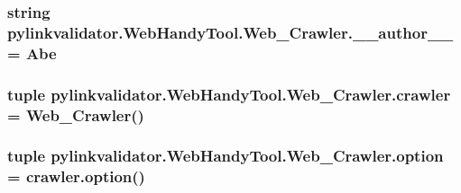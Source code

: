 \subsubsection[{\+\_\+\+\_\+author\+\_\+\+\_\+}]{\setlength{\rightskip}{0pt plus 5cm}string pylinkvalidator.\+Web\+Handy\+Tool.\+Web\+\_\+\+Crawler.\+\_\+\+\_\+author\+\_\+\+\_\+ = \textquotesingle{}Abe\textquotesingle{}}\hypertarget{namespacepylinkvalidator_1_1_web_handy_tool_1_1_web___crawler_affb3151f3f1a14a483da5ff3c2c148cf}{}\label{namespacepylinkvalidator_1_1_web_handy_tool_1_1_web___crawler_affb3151f3f1a14a483da5ff3c2c148cf}
\subsubsection[{crawler}]{\setlength{\rightskip}{0pt plus 5cm}tuple pylinkvalidator.\+Web\+Handy\+Tool.\+Web\+\_\+\+Crawler.\+crawler = {\bf Web\+\_\+\+Crawler}()}\hypertarget{namespacepylinkvalidator_1_1_web_handy_tool_1_1_web___crawler_a3b4c79fe9756714e1b12573b644499bc}{}\label{namespacepylinkvalidator_1_1_web_handy_tool_1_1_web___crawler_a3b4c79fe9756714e1b12573b644499bc}
\subsubsection[{option}]{\setlength{\rightskip}{0pt plus 5cm}tuple pylinkvalidator.\+Web\+Handy\+Tool.\+Web\+\_\+\+Crawler.\+option = crawler.\+option()}\hypertarget{namespacepylinkvalidator_1_1_web_handy_tool_1_1_web___crawler_a51cc3473f0ab9b1254af83e5559b129e}{}\label{namespacepylinkvalidator_1_1_web_handy_tool_1_1_web___crawler_a51cc3473f0ab9b1254af83e5559b129e}
